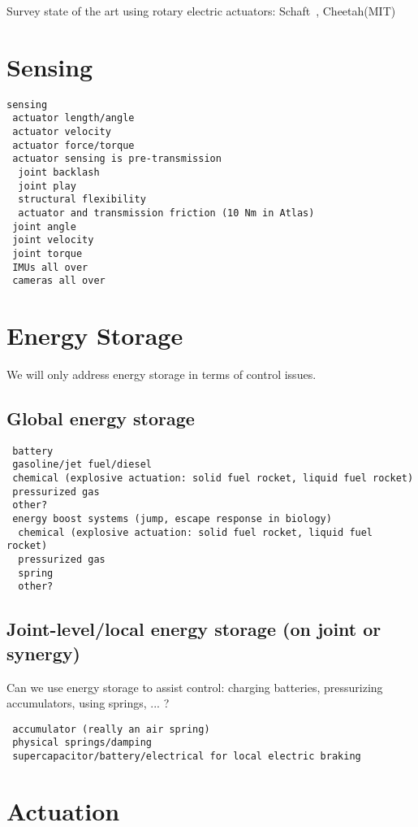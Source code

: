 \documentclass[letterpaper,12pt,fullpage]{article}
\begin{document}
Survey state of the art using rotary electric actuators:
Schaft~\cite{shaft_foot_placement,shaft_push_recov}, Cheetah(MIT)

\section{Sensing}

\begin{verbatim}
sensing
 actuator length/angle
 actuator velocity
 actuator force/torque 
 actuator sensing is pre-transmission
  joint backlash
  joint play
  structural flexibility
  actuator and transmission friction (10 Nm in Atlas)
 joint angle
 joint velocity
 joint torque
 IMUs all over
 cameras all over
\end{verbatim}

\section{Energy Storage}

We will only address energy storage
in terms of control issues.

\subsection{Global energy storage}

\begin{verbatim}
 battery
 gasoline/jet fuel/diesel
 chemical (explosive actuation: solid fuel rocket, liquid fuel rocket)
 pressurized gas
 other?
 energy boost systems (jump, escape response in biology)
  chemical (explosive actuation: solid fuel rocket, liquid fuel rocket)
  pressurized gas
  spring
  other?
\end{verbatim}

\subsection{Joint-level/local energy storage (on joint or synergy)}

Can we use energy storage to assist control: charging batteries,
pressurizing accumulators, using springs, ... ?

\begin{verbatim}
 accumulator (really an air spring)
 physical springs/damping
 supercapacitor/battery/electrical for local electric braking
\end{verbatim}

\section{Actuation}
\end{document}
